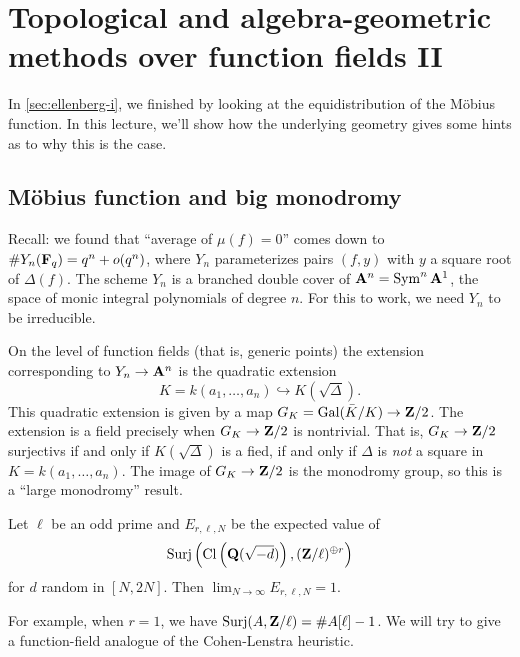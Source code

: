 
\section{Topological and algebra-geometric methods over function fields II}\label{sec:ellenberg-ii}





In \autoref{sec:ellenberg-i}, we finished by looking at the equidistribution of 
the M\"obius function. In this lecture, we'll show how the underlying geometry 
gives some hints as to why this is the case. 





\subsection{M\"obius function and big monodromy}

Recall: we found that ``average of $\mu(f)=0$'' comes down to 
$\# Y_n(\mathbf{F}_q) = q^n+o(q^n)$, where $Y_n$ parameterizes pairs $(f,y)$ with $y$ 
a square root of $\Delta(f)$. The scheme $Y_n$ is a branched double cover of 
$\mathbf{A}^n=\operatorname{Sym}^n\mathbf{A}^1$, the space of monic integral polynomials of degree 
$n$.  For this to work, we need $Y_n$ to be irreducible. 

On the level of function fields (that is, generic points) the extension 
corresponding to $Y_n \to \mathbf{A}^n$ is the quadratic extension 
\[
  K = k(a_1,\dots,a_n) \hookrightarrow K(\sqrt\Delta) .
\]
This quadratic extension is given by a map $G_K=\operatorname{Gal}(\bar K/K)\to \mathbf{Z}/2$. 
The extension is a field precisely when $G_K\to \mathbf{Z}/2$ is nontrivial. That is, 
$G_K\to \mathbf{Z}/2$ surjectivs if and only if $K(\sqrt\Delta)$ is a fied, if and 
only if $\Delta$ is \emph{not} a square in $K=k(a_1,\dots,a_n)$. The image of 
$G_K\to \mathbf{Z}/2$ is the monodromy group, so this is a ``large monodromy'' result. 

\begin{conjecture}
Let $\ell$ be an odd prime and $E_{r,\ell,N}$ be the expected value of 
\[
  \operatorname{Surj}\left(\operatorname{Cl}\left(\mathbf{Q}(\sqrt{-d})\right), (\mathbf{Z}/\ell)^{\oplus r}\right) 
\]
for $d$ random in $[N,2 N]$. Then $\lim_{N\to\infty} E_{r,\ell,N} = 1$. 
\end{conjecture}

For example, when $r=1$, we have $\operatorname{Surj}(A,\mathbf{Z}/\ell) = \#A[\ell]-1$. We 
will try to give a function-field analogue of the Cohen-Lenstra heuristic. 





